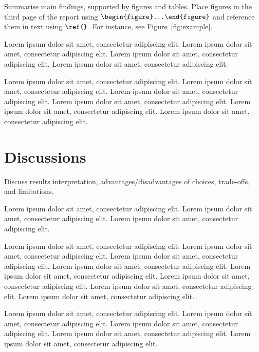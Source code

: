 \documentclass[english]{article}
\begin{document}
Summarise main findings, supported by figures and tables.
Place figures in the third page of the report using $\verb|\begin{figure}...\end{figure}|$ and reference them in text using $\verb|\ref{}|$. For instance, see Figure~\ref{fig:example}.

Lorem ipsum dolor sit amet, consectetur adipiscing elit.
Lorem ipsum dolor sit amet, consectetur adipiscing elit. 
Lorem ipsum dolor sit amet, consectetur adipiscing elit. 
Lorem ipsum dolor sit amet, consectetur adipiscing elit. 

Lorem ipsum dolor sit amet, consectetur adipiscing elit. 
Lorem ipsum dolor sit amet, consectetur adipiscing elit. 
Lorem ipsum dolor sit amet, consectetur adipiscing elit. 
Lorem ipsum dolor sit amet, consectetur adipiscing elit. 
Lorem ipsum dolor sit amet, consectetur adipiscing elit. 
Lorem ipsum dolor sit amet, consectetur adipiscing elit. 

\section{Discussions}
Discuss results interpretation, advantages/disadvantages of choices, trade-offs, and limitations.

Lorem ipsum dolor sit amet, consectetur adipiscing elit.
Lorem ipsum dolor sit amet, consectetur adipiscing elit. 
Lorem ipsum dolor sit amet, consectetur adipiscing elit. 

Lorem ipsum dolor sit amet, consectetur adipiscing elit. 
Lorem ipsum dolor sit amet, consectetur adipiscing elit. 
Lorem ipsum dolor sit amet, consectetur adipiscing elit. 
Lorem ipsum dolor sit amet, consectetur adipiscing elit. 
Lorem ipsum dolor sit amet, consectetur adipiscing elit. 
Lorem ipsum dolor sit amet, consectetur adipiscing elit. 
Lorem ipsum dolor sit amet, consectetur adipiscing elit. 
Lorem ipsum dolor sit amet, consectetur adipiscing elit. 

Lorem ipsum dolor sit amet, consectetur adipiscing elit. 
Lorem ipsum dolor sit amet, consectetur adipiscing elit. 
Lorem ipsum dolor sit amet, consectetur adipiscing elit. 
Lorem ipsum dolor sit amet, consectetur adipiscing elit. 
Lorem ipsum dolor sit amet, consectetur adipiscing elit. 
\end{document}

